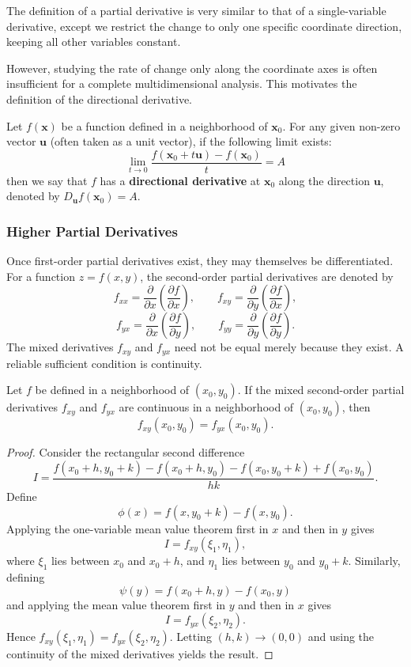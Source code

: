 The definition of a partial derivative is very similar to that of a single-variable derivative, except we restrict the change to only one specific coordinate direction, keeping all other variables constant.

However, studying the rate of change only along the coordinate axes is often insufficient for a complete multidimensional analysis. This motivates the definition of the directional derivative.

\begin{definition}
Let $f(\mathbf{x})$ be a function defined in a neighborhood of $\mathbf{x}_0$. For any given non-zero vector $\mathbf{u}$ (often taken as a unit vector), if the following limit exists:
\[ \lim_{t \to 0} \frac{f(\mathbf{x}_0 + t\mathbf{u}) - f(\mathbf{x}_0)}{t} = A \]
then we say that $f$ has a \textbf{directional derivative} at $\mathbf{x}_0$ along the direction $\mathbf{u}$, denoted by $D_{\mathbf{u}} f(\mathbf{x}_0) = A$.
\end{definition}

\subsubsection{Higher Partial Derivatives}

Once first-order partial derivatives exist, they may themselves be differentiated. For a function $z=f(x,y)$, the second-order partial derivatives are denoted by
\[
    f_{xx}=\frac{\partial}{\partial x}\left(\frac{\partial f}{\partial x}\right),\qquad
    f_{xy}=\frac{\partial}{\partial y}\left(\frac{\partial f}{\partial x}\right),
\]
\[
    f_{yx}=\frac{\partial}{\partial x}\left(\frac{\partial f}{\partial y}\right),\qquad
    f_{yy}=\frac{\partial}{\partial y}\left(\frac{\partial f}{\partial y}\right).
\]
The mixed derivatives $f_{xy}$ and $f_{yx}$ need not be equal merely because they exist. A reliable sufficient condition is continuity.

\begin{theorem}
Let $f$ be defined in a neighborhood of $(x_0,y_0)$. If the mixed second-order partial derivatives $f_{xy}$ and $f_{yx}$ are continuous in a neighborhood of $(x_0,y_0)$, then
\[
    f_{xy}(x_0,y_0)=f_{yx}(x_0,y_0).
\]
\end{theorem}

\begin{proof}
Consider the rectangular second difference
\[
I=\frac{f(x_0+h,y_0+k)-f(x_0+h,y_0)-f(x_0,y_0+k)+f(x_0,y_0)}{hk}.
\]
Define
\[
    \phi(x)=f(x,y_0+k)-f(x,y_0).
\]
Applying the one-variable mean value theorem first in $x$ and then in $y$ gives
\[
    I=f_{xy}(\xi_1,\eta_1),
\]
where $\xi_1$ lies between $x_0$ and $x_0+h$, and $\eta_1$ lies between $y_0$ and $y_0+k$. Similarly, defining
\[
    \psi(y)=f(x_0+h,y)-f(x_0,y)
\]
and applying the mean value theorem first in $y$ and then in $x$ gives
\[
    I=f_{yx}(\xi_2,\eta_2).
\]
Hence $f_{xy}(\xi_1,\eta_1)=f_{yx}(\xi_2,\eta_2)$. Letting $(h,k)\to(0,0)$ and using the continuity of the mixed derivatives yields the result.
\end{proof}

